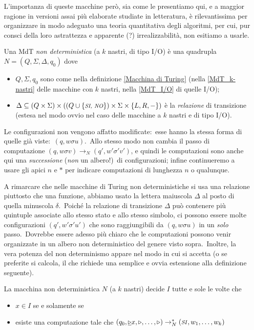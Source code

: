 L'importanza di queste macchine però, sia come le presentiamo qui, e a maggior ragione in versioni assai più elaborate studiate in letteratura, è rilevantissima per organizzare in modo adeguato una teoria quantitativa degli algoritmi, per cui, pur consci della loro astrattezza e apparente (?) irrealizzabilità, non esitiamo a usarle.

\begin{definition}
    \label{MdT_non-det}
    Una MdT \textit{non deterministica} (a $k$ nastri, di tipo I/O) è una quadrupla $N = (Q, \Sigma, \Delta, q_0)$ dove
    \begin{itemize}
        \item $Q, \Sigma, q_0$ sono come nella definizione \ref{Macchina di Turing} (nella \ref{MdT_k-nastri} delle macchine con $k$ nastri, nella \ref{MdT_I/O} di quelle I/O);
        \item $\Delta \subseteq (Q \times \Sigma) \times ((Q \cup \{\mbox{\textit{\footnotesize SI, NO}}\}) \times \Sigma \times \{L,R,-\})$ è la \textit{relazione} di transizione (estesa nel modo ovvio nel caso delle macchine a $k$ nastri e di tipo I/O).
    \end{itemize}
    Le configurazioni non vengono affatto modificate:\ esse hanno la stessa forma di quelle già viste:\ $(q, w\sigma u)$.\
    Allo stesso modo non cambia il passo di computazione $(q, w \sigma v) \rightarrow_N (q', w'\sigma'v')$, e quindi le computazioni sono anche qui una \textit{successione} (\textit{non} un albero!)\ di configurazioni; infine continueremo a usare gli apici $n$ e $*$ per indicare computazioni di lunghezza $n$ o qualunque.\
\end{definition}

\noindent A rimarcare che nelle macchine di Turing non deterministiche si usa una relazione piuttosto che una funzione, abbiamo usato la lettera maiuscola $\Delta$ al posto di quella minuscola $\delta$.\
Poiché la relazione di transizione $\Delta$ può contenere più quintuple associate allo stesso stato e allo stesso simbolo, ci possono essere molte configurazioni $(q', w' \sigma' u')$ che sono raggiungibili da $(q, w \sigma u)$ in un \textit{solo} passo.\
Dovrebbe essere adesso più chiaro che le computazioni possono venir organizzate in un albero non deterministico del genere visto sopra.\
Inoltre, la vera potenza del non determinismo appare nel modo in cui si accetta (o se preferite si calcola, il che richiede una semplice e ovvia estensione alla definizione seguente).\

\begin{definition}
    La macchina non deterministica $N$ (a $k$ nastri) decide $I$ tutte e sole le volte che
    \begin{itemize}
        \itemsep0px
        \item[] $x \in I$ se e solamente se
        \item[] esiste una computazione tale che $(q_0, \underline{\triangleright}x, \triangleright, \dots,\triangleright) \rightarrow^*_N (\mbox{\textit{\footnotesize SI}}, w_1, \dots,w_k)$
    \end{itemize}
\end{definition}

